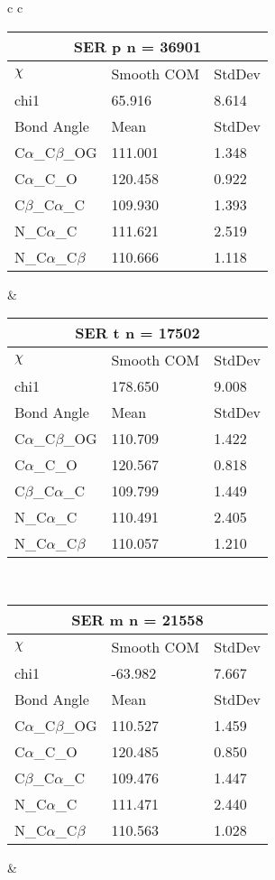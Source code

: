 \begin{longtable}{ c c }
  \begin{tabular}{ l l l }
  \toprule
  \multicolumn{3}{c}{SER \textbf{p} n = 36901} \\ \toprule
  $\chi$       & Smooth COM & StdDev \\ \midrule
  chi1 & 65.916 & 8.614 \\ \midrule
  Bond Angle   & Mean     & StdDev \\ \midrule
  C$\alpha$\_C$\beta$\_OG & 111.001 & 1.348\\
  C$\alpha$\_C\_O & 120.458 & 0.922\\
  C$\beta$\_C$\alpha$\_C & 109.930 & 1.393\\
  N\_C$\alpha$\_C & 111.621 & 2.519\\
  N\_C$\alpha$\_C$\beta$ & 110.666 & 1.118\\
  \bottomrule
  \end{tabular}
  &
  \begin{tabular}{ l l l }
  \toprule
  \multicolumn{3}{c}{SER \textbf{t} n = 17502} \\ \toprule
  $\chi$       & Smooth COM & StdDev \\ \midrule
  chi1 & 178.650 & 9.008 \\ \midrule
  Bond Angle   & Mean     & StdDev \\ \midrule
  C$\alpha$\_C$\beta$\_OG & 110.709 & 1.422\\
  C$\alpha$\_C\_O & 120.567 & 0.818\\
  C$\beta$\_C$\alpha$\_C & 109.799 & 1.449\\
  N\_C$\alpha$\_C & 110.491 & 2.405\\
  N\_C$\alpha$\_C$\beta$ & 110.057 & 1.210\\
  \bottomrule
  \end{tabular}
  \\
  \begin{tabular}{ l l l }
  \toprule
  \multicolumn{3}{c}{SER \textbf{m} n = 21558} \\ \toprule
  $\chi$       & Smooth COM & StdDev \\ \midrule
  chi1 & -63.982 & 7.667 \\ \midrule
  Bond Angle   & Mean     & StdDev \\ \midrule
  C$\alpha$\_C$\beta$\_OG & 110.527 & 1.459\\
  C$\alpha$\_C\_O & 120.485 & 0.850\\
  C$\beta$\_C$\alpha$\_C & 109.476 & 1.447\\
  N\_C$\alpha$\_C & 111.471 & 2.440\\
  N\_C$\alpha$\_C$\beta$ & 110.563 & 1.028\\
  \bottomrule
  \end{tabular}
  &
  \\
  
\end{longtable}    

